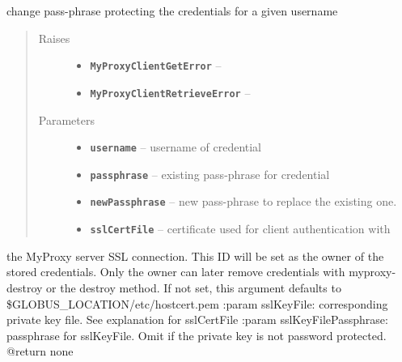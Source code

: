 \documentclass[letterpaper,10pt,english]{sphinxmanual}
\begin{document}
\begin{fulllineitems}
\begin{fulllineitems}
\end{fulllineitems}


\begin{fulllineitems}
\label{client:myproxy.client.MyProxyClient.changePassphrase}
change pass-phrase protecting the credentials for a given username
\begin{quote}\begin{description}
\item[{Raises}] \leavevmode\begin{itemize}
\item {} 
\textbf{\texttt{MyProxyClientGetError}} -- 

\item {} 
\textbf{\texttt{MyProxyClientRetrieveError}} -- 

\end{itemize}

\item[{Parameters}] \leavevmode\begin{itemize}
\item {} 
\textbf{\texttt{username}} -- username of credential

\item {} 
\textbf{\texttt{passphrase}} -- existing pass-phrase for credential

\item {} 
\textbf{\texttt{newPassphrase}} -- new pass-phrase to replace the existing one.

\item {} 
\textbf{\texttt{sslCertFile}} -- certificate used for client authentication with

\end{itemize}

\end{description}\end{quote}

the MyProxy server SSL connection.  This ID will be set as the owner
of the stored credentials.  Only the owner can later remove 
credentials with myproxy-destroy or the destroy method.  If not set,
this argument defaults to \$GLOBUS\_LOCATION/etc/hostcert.pem 
:param sslKeyFile: corresponding private key file.  See explanation
for sslCertFile
:param sslKeyFilePassphrase: passphrase for sslKeyFile.  Omit if the
private key is not password protected.  
@return none


\end{fulllineitems}
\end{fulllineitems}
\end{document}
